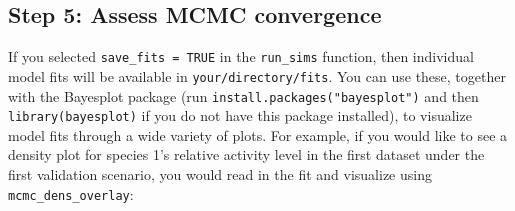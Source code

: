 \documentclass[
]{article}
\newenvironment{Shaded}{\begin{snugshade}}{\end{snugshade}}
\newcommand{\AttributeTok}[1]{\textcolor[rgb]{0.13,0.29,0.53}{#1}}
\newcommand{\CommentTok}[1]{\textcolor[rgb]{0.56,0.35,0.01}{\textit{#1}}}
\newcommand{\ConstantTok}[1]{\textcolor[rgb]{0.56,0.35,0.01}{#1}}
\newcommand{\DecValTok}[1]{\textcolor[rgb]{0.00,0.00,0.81}{#1}}
\newcommand{\FunctionTok}[1]{\textcolor[rgb]{0.13,0.29,0.53}{\textbf{#1}}}
\newcommand{\NormalTok}[1]{#1}
\newcommand{\OtherTok}[1]{\textcolor[rgb]{0.56,0.35,0.01}{#1}}
\newcommand{\SpecialCharTok}[1]{\textcolor[rgb]{0.81,0.36,0.00}{\textbf{#1}}}
\newcommand{\StringTok}[1]{\textcolor[rgb]{0.31,0.60,0.02}{#1}}
\begin{document}
\linespread{1}

\begin{Shaded}
\end{Shaded}

\linespread{1}

\hypertarget{step-5-assess-mcmc-convergence}{%
\subsection{Step 5: Assess MCMC convergence}\label{step-5-assess-mcmc-convergence}}

If you selected \texttt{save\_fits\ =\ TRUE} in the \texttt{run\_sims} function, then individual model fits will be available in \texttt{your/directory/fits}. You can use these, together with the Bayesplot package (run \texttt{install.packages("bayesplot")} and then \texttt{library(bayesplot)} if you do not have this package installed), to visualize model fits through a wide variety of plots. For example, if you would like to see a density plot for species 1's relative activity level in the first dataset under the first validation scenario, you would read in the fit and visualize using \texttt{mcmc\_dens\_overlay}:

\linespread{1}
\end{document}
